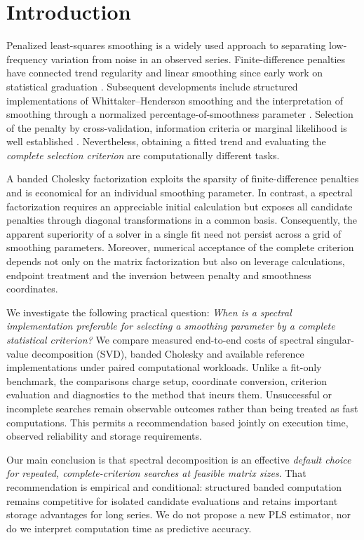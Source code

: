 \section{Introduction}
Penalized least-squares smoothing is a widely used approach to separating low-frequency variation from noise in an observed series. Finite-difference penalties have connected trend regularity and linear smoothing since early work on statistical graduation \citep{whittaker1923graduation}. Subsequent developments include structured implementations of Whittaker--Henderson smoothing \citep{weinert2007wh,weinert2012fast,biessy2026wh} and the interpretation of smoothing through a normalized percentage-of-smoothness parameter \citep{guerrero2007penalized,guerrero2008smoothness}. Selection of the penalty by cross-validation, information criteria or marginal likelihood is well established \citep{craven1979gcv,cortes2017smoothness}. Nevertheless, obtaining a fitted trend and evaluating the \emph{complete selection criterion} are computationally different tasks.

A banded Cholesky factorization exploits the sparsity of finite-difference penalties and is economical for an individual smoothing parameter. In contrast, a spectral factorization requires an appreciable initial calculation but exposes all candidate penalties through diagonal transformations in a common basis. Consequently, the apparent superiority of a solver in a single fit need not persist across a grid of smoothing parameters. Moreover, numerical acceptance of the complete criterion depends not only on the matrix factorization but also on leverage calculations, endpoint treatment and the inversion between penalty and smoothness coordinates.

We investigate the following practical question: \emph{When is a spectral implementation preferable for selecting a smoothing parameter by a complete statistical criterion?} We compare measured end-to-end costs of spectral singular-value decomposition (SVD), banded Cholesky and available reference implementations under paired computational workloads. Unlike a fit-only benchmark, the comparisons charge setup, coordinate conversion, criterion evaluation and diagnostics to the method that incurs them. Unsuccessful or incomplete searches remain observable outcomes rather than being treated as fast computations. This permits a recommendation based jointly on execution time, observed reliability and storage requirements.

Our main conclusion is that spectral decomposition is an effective \emph{default choice for repeated, complete-criterion searches at feasible matrix sizes}. That recommendation is empirical and conditional: structured banded computation remains competitive for isolated candidate evaluations and retains important storage advantages for long series. We do not propose a new PLS estimator, nor do we interpret computation time as predictive accuracy.

